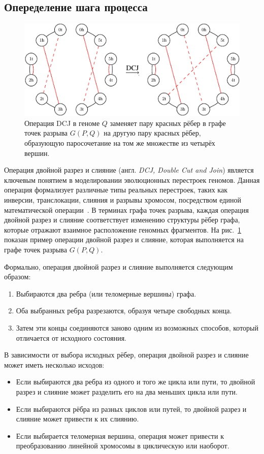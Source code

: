 \subsection{Опеределение шага процесса}
\label{subsec:dcj_operation}

\begin{figure}
    \includegraphics[width=\linewidth]{images/part1/dcj-example.pdf}
    \caption{Операция DCJ в геноме $Q$ заменяет пару красных рёбер в графе точек разрыва $G(P, Q)$ на другую пару красных рёбер, образующую паросочетание на том же множестве из четырёх вершин.}
    \label{fig:dcj}
  \end{figure}

Операция двойной разрез и слияние (англ. \textit{DCJ, Double Cut and Join}) является ключевым понятием в моделировании эволюционных перестроек геномов.
Данная операция формализует различные типы реальных перестроек, таких как инверсии, транслокации, слияния и разрывы хромосом, посредством единой математической операции~\cite{yancopoulos2005}.
В терминах графа точек разрыва, каждая операция двойной разрез и слияние соответствует изменению структуры рёбер графа, которые отражают взаимное расположение геномных фрагментов.
На рис.~\ref{fig:dcj} показан пример операции двойной разрез и слияние, которая выполняется на графе точек разрыва $G(P, Q)$.

Формально, операция двойной разрез и слияние выполняется следующим образом:
\begin{enumerate}
    \item Выбираются два ребра (или теломерные вершины) графа.
    \item Оба выбранных ребра разрезаются, образуя четыре свободных конца.
    \item Затем эти концы соединяются заново одним из возможных способов, который отличается от исходного состояния.
\end{enumerate}

В зависимости от выбора исходных рёбер, операция двойной разрез и слияние может иметь несколько исходов:
\begin{itemize}
    \item Если выбираются два ребра из одного и того же цикла или пути, то двойной разрез и слияние может разделить его на два меньших цикла или пути.
    \item Если выбираются рёбра из разных циклов или путей, то двойной разрез и слияние может привести к их слиянию.
    \item Если выбирается теломерная вершина, операция может привести к преобразованию линейной хромосомы в циклическую или наоборот.
\end{itemize}

